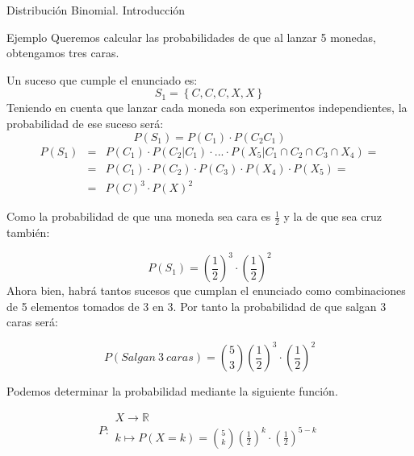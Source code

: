 \documentclass[11pt,handout]{beamer}
\begin{document}
\begin{frame}
{Distribución Binomial. Introducción}
\begin{block}{Ejemplo} Queremos calcular las probabilidades de que al lanzar 5 monedas, obtengamos tres caras.
\end{block}
Un suceso que cumple el enunciado es:
$$S_1=\left\lbrace C,C,C,X,X \right\rbrace$$
Teniendo en cuenta que lanzar cada moneda son experimentos independientes, la probabilidad de ese suceso será:
$$P\left(S_1\right)=P\left(C_1\right)\cdot P\left(C_2 C_1 \right)$$
\begin{eqnarray*}
P\left(S_1\right) & = &P\left(C_1\right)\cdot P\left(C_2 | C_1 \right)\cdot ... \cdot P\left(X_5 | C_1 \cap C_2  \cap C_3  \cap X_4   \right)= \\ &  = & P\left(C_1\right)\cdot  P\left(C_2\right) \cdot P\left(C_3\right) \cdot P\left(X_4\right) \cdot P\left(X_5\right)= \\
& = & P\left(C\right)^3\cdot  P\left(X\right)^2
\end{eqnarray*}


\end{frame}

\begin{frame}{}
Como la probabilidad de que una moneda sea cara es $\frac{1}{2}$ y la de que sea cruz también:

$$P\left(S_1\right)=\left(\frac{1}{2}\right)^3\cdot  \left(\frac{1}{2}\right)^2$$
Ahora bien, habrá tantos sucesos que cumplan el enunciado como combinaciones de 5 elementos tomados de 3 en 3. Por tanto la probabilidad de que salgan 3 caras será:

$$P\left(Salgan \ 3 \ caras\right)=\binom{5}{3}\left(\frac{1}{2}\right)^3\cdot  \left(\frac{1}{2}\right)^2$$

\end{frame}

\begin{frame}{}

Podemos determinar la probabilidad mediante la siguiente función.

$$P\colon \begin{array}{l} 
          X \rightarrow \mathbb{R} \\ 
          k\mapsto P(X=k)=\binom{5}{k}\left(\frac{1}{2}\right)^k\cdot  \left(\frac{1}{2}\right)^{5-k} 
         \end{array}$$

\end{frame}
\end{document}
